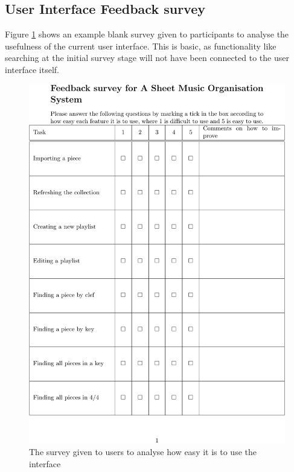 \begin{appendices}
\section{User Interface Feedback survey}
Figure \ref{fig:survey} shows an example blank survey given to participants to analyse the usefulness of the current user interface. This is basic, as functionality like searching at the initial survey stage will not have been connected to the user interface itself.
\begin{figure}[H]
\centering
\includegraphics{survey-crop.pdf}	
\caption{The survey given to users to analyse how easy it is to use the interface}
\label{fig:survey}
\end{figure}

\end{appendices}
